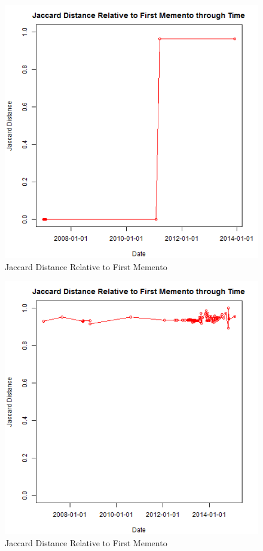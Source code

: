 \documentclass[12pt]{Report}
\begin{document}
\begin{figure}[ht]    
    \begin{center}
        \includegraphics[scale=0.60]{link15.png}
        \caption{Jaccard Distance Relative to First Memento }
        \label{Jaccard Distance Relative to First Memento}
    \end{center}
\end{figure}
\newpage

\begin{figure}[ht]    
    \begin{center}
        \includegraphics[scale=0.60]{link16.png}
        \caption{Jaccard Distance Relative to First Memento }
        \label{Jaccard Distance Relative to First Memento}
    \end{center}
\end{figure}
\newpage
\end{document}
